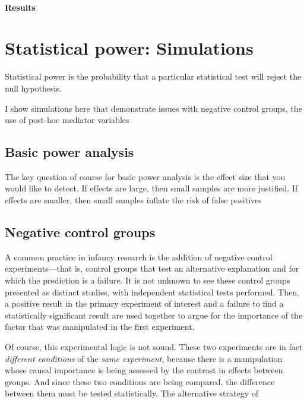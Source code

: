 \documentclass[man,noapacite]{apa2}
\begin{document}
\paragraph{Results}



\section{Statistical power: Simulations}

Statistical power is the probability that a particular statistical test will reject the null hypothesis. 

I show simulations here that demonstrate issues with negative control groups, the use of post-hoc mediator variables

\subsection{Basic power analysis}

The key question of course for basic power analysis is the effect size that you would like to detect. If effects are large, then small samples are more justified. If effects are smaller, then small samples inflate the risk of false positives

\subsection{Negative control groups}

A common practice in infancy research is the addition of negative control experiments---that is, control groups that test an alternative explanation and for which the prediction is a failure. It is not unknown to see these control groups presented as distinct studies, with independent statistical tests performed. Then, a positive result in the primary experiment of interest and a failure to find a statistically significant result are used together to argue for the importance of the factor that was manipulated in the first experiment. 

Of course, this experimental logic is not sound. These two experiments are in fact \emph{different conditions} of the \emph{same experiment}, because there is a manipulation whose causal importance is being assessed by the contrast in effects between groups. And since these two conditions are being compared, the difference between them must be tested statistically. The alternative strategy of 
\cite{gelman,nrn-significnotsignif}
\end{document}
